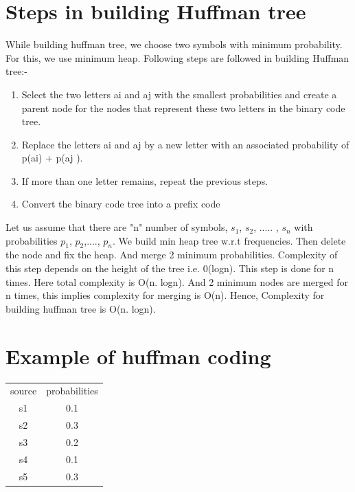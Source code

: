 \documentclass[10pt,a4paper]{article}
\begin{document}
\section*{Steps in building Huffman tree}
While building huffman tree, we choose two symbols with minimum probability. For this, we use minimum heap. Following steps are followed in building Huffman tree:-   
\begin{enumerate}
	\item Select the two letters ai and aj with the smallest probabilities and create a parent node for the nodes that represent these two letters in the binary code tree. 
	\item Replace the letters ai and aj by a new letter with an associated probability of p(ai) + p(aj ). 
	\item If more than one letter remains, repeat the previous steps. 
	\item Convert the binary code tree into a prefix code
\end{enumerate}
Let us assume that there are "n" number of symbols, $s_1$, $s_2$, ..... , $s_n$ with probabilities $p_1$, $p_2$,...., $p_n$. We build min heap tree w.r.t frequencies. Then delete the node and fix the heap. And merge 2 minimum probabilities. Complexity of this step depends on the height of the tree i.e. 0(logn). This step is done for n times. Here total complexity is O(n. logn). And 2 minimum nodes are merged for n times, this implies complexity for merging is O(n). 
Hence, Complexity for building huffman tree is O(n. logn).
\section*{Example of huffman coding}

\begin{center}
\begin{tabular}{ c c }
		source & probabilities\\
		s1 & 0.1  \\ 
		s2 & 0.3 \\  
		s3 & 0.2  \\ 
		s4 & 0.1  \\
		s5 & 0.3 \\ 
\end{tabular}
\end{center}
\end{document}
